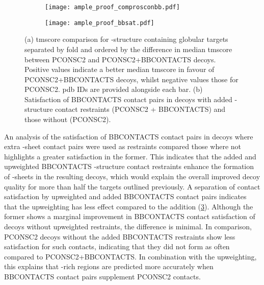 \begin{figure}[H]
    \centering
    \begin{subfigure}[b]{\textwidth}
        \centering
        \texttt{[image: ample\_proof\_comprosconbb.pdf]}
        \caption{}
        \label{fig:ample_proof_comprosconbb}
    \end{subfigure}
    
    \begin{subfigure}[b]{\textwidth}
        \centering
        \texttt{[image: ample\_proof\_bbsat.pdf]}
        \caption{}
        \label{fig:ample_proof_bbsat}
    \end{subfigure}
    
    \caption[Decoy analysis of effects of BBCONTACTS contact addition]{(a) \Gls{tmscore} comparison for \textbeta-structure containing globular targets separated by fold and ordered by the difference in median \gls{tmscore} between PCONSC2 and PCONSC2+BBCONTACTS decoys. Positive values indicate a better median \gls{tmscore} in favour of PCONSC2+BBCONTACTS decoys, whilst negative values those for PCONSC2. \Gls{pdb} IDs are provided alongside each bar. (b) Satisfaction of BBCONTACTS contact pairs in decoys with added \textbeta-structure contact restraints (PCONSC2 + BBCONTACTS) and those without (PCONSC2).}
\end{figure}

An analysis of the satisfaction of BBCONTACTS contact pairs in decoys where extra \textbeta-sheet contact pairs were used as restraints compared those where not highlights a greater satisfaction in the former. This indicates that the added and upweighted BBCONTACTS \textbeta-structure contact restraints enhance the formation of \textbeta-sheets in the resulting decoys, which would explain the overall improved decoy quality for more than half the targets outlined previously. A separation of contact satisfaction by upweighted and added BBCONTACTS contact pairs indicates that the upweighting has less effect compared to the addition (\cref{fig:ample_proof_bbsat}). Although the former shows a marginal improvement in BBCONTACTS contact satisfaction of decoys without upweighted restraints, the difference is minimal. In comparison, PCONSC2 decoys without the added BBCONTACTS restraints show less satisfaction for such contacts, indicating that they did not form as often compared to PCONSC2+BBCONTACTS. In combination with the upweighting, this explains that \textbeta-rich regions are predicted more accurately when BBCONTACTS contact pairs supplement PCONSC2 contacts.

